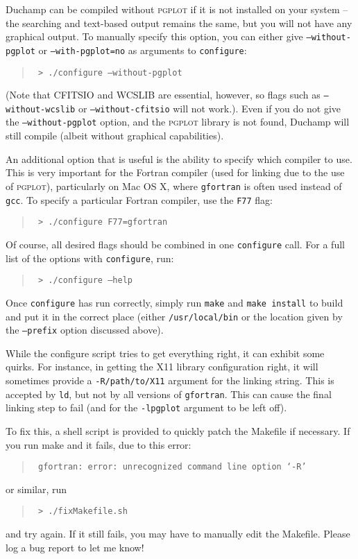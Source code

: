 Duchamp can be compiled without \textsc{pgplot} if it is not installed
on your system -- the searching and text-based output remains the
same, but you will not have any graphical output.  To manually specify
this option, you can either give \texttt{--without-pgplot} or
\texttt{--with-pgplot=no} as arguments to \texttt{configure}:
\begin{quote}
{\footnotesize
\texttt{%
> ./configure --without-pgplot}
}
\end{quote}

(Note that CFITSIO and WCSLIB are essential, however, so flags such as
\texttt{--without-wcslib} or \texttt{--without-cfitsio} will not
work.).  Even if you do not give the \texttt{--without-pgplot} option,
and the \textsc{pgplot} library is not found, Duchamp will still
compile (albeit without graphical capabilities).

An additional option that is useful is the ability to specify which
compiler to use. This is very important for the Fortran compiler (used
for linking due to the use of \textsc{pgplot}), particularly on Mac OS
X, where \texttt{gfortran} is often used instead of \texttt{gcc}. To
specify a particular Fortran compiler, use the \texttt{F77} flag:
\begin{quote}
{\footnotesize
\texttt{%
> ./configure F77=gfortran}
}
\end{quote}

Of course, all desired flags should be combined in one
\texttt{configure} call. For a full list of the options with
\texttt{configure}, run:
\begin{quote}
{\footnotesize
\texttt{%
> ./configure --help}
}
\end{quote}
Once \texttt{configure} has run correctly, simply run \texttt{make}
and \texttt{make install} to build \duchamp and put it in the correct
place (either \texttt{/usr/local/bin} or the location given by the
\texttt{--prefix} option discussed above).


While the configure script tries to get everything right, it can
exhibit some quirks. For instance, in getting the X11 library
configuration right, it will sometimes provide a
\texttt{-R/path/to/X11} argument for the linking string. This is
accepted by \texttt{ld}, but not by all versions of \texttt{gfortran}.
This can cause the final linking step to fail (and for the
\texttt{-lpgplot} argument to be left off).

To fix this, a shell script is provided to quickly patch the Makefile
if necessary. If you run make and it fails, due to this error:
\begin{quote}
{\footnotesize
\texttt{%
   gfortran: error: unrecognized command line option ‘-R’}
}
\end{quote}
 or similar, run 
\begin{quote}
{\footnotesize
\texttt{%
 > ./fixMakefile.sh}
}
\end{quote}
and try again. If it still fails, you may have to manually edit the
Makefile. Please log a bug report to let me know!



